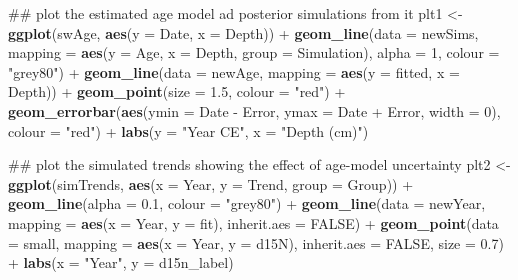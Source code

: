 \documentclass[12pt,]{article}
\newenvironment{Shaded}{\begin{snugshade}}{\end{snugshade}}
\newcommand{\KeywordTok}[1]{\textcolor[rgb]{0.13,0.29,0.53}{\textbf{{#1}}}}
\newcommand{\DataTypeTok}[1]{\textcolor[rgb]{0.13,0.29,0.53}{{#1}}}
\newcommand{\DecValTok}[1]{\textcolor[rgb]{0.00,0.00,0.81}{{#1}}}
\newcommand{\FloatTok}[1]{\textcolor[rgb]{0.00,0.00,0.81}{{#1}}}
\newcommand{\StringTok}[1]{\textcolor[rgb]{0.31,0.60,0.02}{{#1}}}
\newcommand{\OtherTok}[1]{\textcolor[rgb]{0.56,0.35,0.01}{{#1}}}
\newcommand{\NormalTok}[1]{{#1}}
\begin{document}
\begin{Shaded}
\begin{Highlighting}[]
\NormalTok{## plot the estimated age model ad posterior simulations from it}
\NormalTok{plt1 <-}\StringTok{ }\KeywordTok{ggplot}\NormalTok{(swAge, }\KeywordTok{aes}\NormalTok{(}\DataTypeTok{y =} \NormalTok{Date, }\DataTypeTok{x =} \NormalTok{Depth)) +}
\StringTok{    }\KeywordTok{geom_line}\NormalTok{(}\DataTypeTok{data =} \NormalTok{newSims,}
              \DataTypeTok{mapping =} \KeywordTok{aes}\NormalTok{(}\DataTypeTok{y =} \NormalTok{Age, }\DataTypeTok{x =} \NormalTok{Depth, }\DataTypeTok{group =} \NormalTok{Simulation),}
              \DataTypeTok{alpha =} \DecValTok{1}\NormalTok{, }\DataTypeTok{colour =} \StringTok{"grey80"}\NormalTok{) +}
\StringTok{    }\KeywordTok{geom_line}\NormalTok{(}\DataTypeTok{data =} \NormalTok{newAge, }\DataTypeTok{mapping =} \KeywordTok{aes}\NormalTok{(}\DataTypeTok{y =} \NormalTok{fitted, }\DataTypeTok{x =} \NormalTok{Depth)) +}
\StringTok{    }\KeywordTok{geom_point}\NormalTok{(}\DataTypeTok{size =} \FloatTok{1.5}\NormalTok{, }\DataTypeTok{colour =} \StringTok{"red"}\NormalTok{) +}
\StringTok{    }\KeywordTok{geom_errorbar}\NormalTok{(}\KeywordTok{aes}\NormalTok{(}\DataTypeTok{ymin =} \NormalTok{Date -}\StringTok{ }\NormalTok{Error, }\DataTypeTok{ymax =} \NormalTok{Date +}\StringTok{ }\NormalTok{Error, }\DataTypeTok{width =} \DecValTok{0}\NormalTok{),}
                  \DataTypeTok{colour =} \StringTok{"red"}\NormalTok{) +}
\StringTok{    }\KeywordTok{labs}\NormalTok{(}\DataTypeTok{y =} \StringTok{"Year CE"}\NormalTok{, }\DataTypeTok{x =} \StringTok{"Depth (cm)"}\NormalTok{)}

\NormalTok{## plot the simulated trends showing the effect of age-model uncertainty}
\NormalTok{plt2 <-}\StringTok{ }\KeywordTok{ggplot}\NormalTok{(simTrends, }\KeywordTok{aes}\NormalTok{(}\DataTypeTok{x =} \NormalTok{Year, }\DataTypeTok{y =} \NormalTok{Trend, }\DataTypeTok{group =} \NormalTok{Group)) +}
\StringTok{    }\KeywordTok{geom_line}\NormalTok{(}\DataTypeTok{alpha =} \FloatTok{0.1}\NormalTok{, }\DataTypeTok{colour =} \StringTok{"grey80"}\NormalTok{) +}
\StringTok{    }\KeywordTok{geom_line}\NormalTok{(}\DataTypeTok{data =} \NormalTok{newYear,}
              \DataTypeTok{mapping =} \KeywordTok{aes}\NormalTok{(}\DataTypeTok{x =} \NormalTok{Year, }\DataTypeTok{y =} \NormalTok{fit), }\DataTypeTok{inherit.aes =} \OtherTok{FALSE}\NormalTok{) +}
\StringTok{    }\KeywordTok{geom_point}\NormalTok{(}\DataTypeTok{data =} \NormalTok{small,}
               \DataTypeTok{mapping =} \KeywordTok{aes}\NormalTok{(}\DataTypeTok{x =} \NormalTok{Year, }\DataTypeTok{y =} \NormalTok{d15N),}
               \DataTypeTok{inherit.aes =} \OtherTok{FALSE}\NormalTok{, }\DataTypeTok{size =} \FloatTok{0.7}\NormalTok{) +}
\StringTok{    }\KeywordTok{labs}\NormalTok{(}\DataTypeTok{x =} \StringTok{"Year"}\NormalTok{, }\DataTypeTok{y =} \NormalTok{d15n_label)}


\end{Highlighting}
\end{Shaded}
\end{document}
